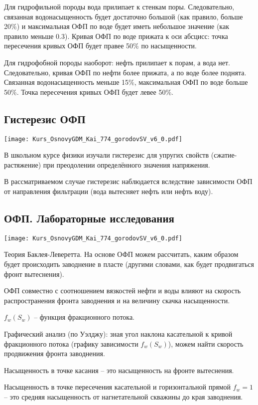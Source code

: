 \documentclass[main.tex]{subfiles}
\begin{document}
Для гидрофильной породы вода прилипает к стенкам поры. Следовательно, связанная водонасыщенность будет достаточно большой (как правило, больше 20\%) и максимальная ОФП по воде будет иметь небольшое значение (как правило меньше 0.3).
Кривая ОФП по воде прижата к оси абсцисс: точка пересечения кривых ОФП будет правее 50\% по насыщенности.

Для гидрофобной породы наоборот: нефть прилипает к порам, а вода нет. Следовательно, кривая ОФП по нефти более прижата, а по воде более поднята.
Связанная водонасыщенность меньше 15\%, максимальная ОФП по воде больше 50\%. Точка пересечения кривых ОФП будет левее 50\%.

\subsection{Гистерезис ОФП}

\texttt{[image: Kurs\_OsnovyGDM\_Kai\_774\_gorodovSV\_v6\_0.pdf]}

В школьном курсе физики изучали гистерезис для упругих свойств (сжатие-растяжение) при преодолении определённого значения напряжения.

В рассматриваемом случае гистерезис наблюдается вследствие зависимости ОФП от направления фильтрации (вода вытесняет нефть или нефть воду).

\subsection{ОФП. Лабораторные исследования}

\texttt{[image: Kurs\_OsnovyGDM\_Kai\_774\_gorodovSV\_v6\_0.pdf]}

Теория Баклея-Леверетта.
На основе ОФП можем рассчитать, каким образом будет происходить заводнение в пласте  (другими словами, как будет продвигаться фронт вытеснения).

ОФП совместно с соотношением вязкостей нефти и воды влияют на скорость распространения фронта заводнения и на величину скачка насыщенности.

$f_w(S_w)$ -- функция фракционного потока.

Графический анализ (по Уэлджу): зная угол наклона касательной к кривой фракционного потока (графику зависимости $f_w(S_w)$), можем найти скорость продвижения фронта заводнения.

Насыщенность в точке касания -- это насыщенность на фронте вытеснения.

Насыщенность в точке пересечения касательной и горизонтальной прямой $f_w=1$ -- это средняя насыщенность от нагнетательной скважины до края заводнения.
\end{document}
